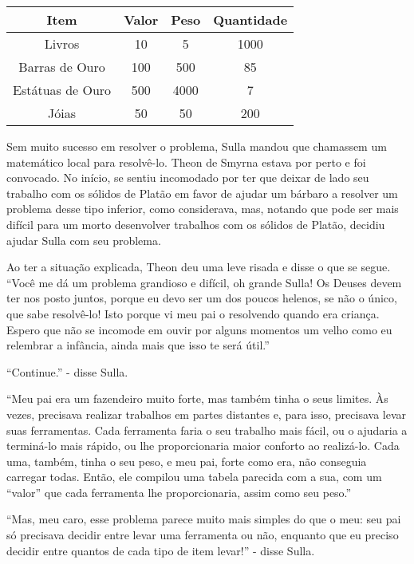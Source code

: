 \begin{center}
  \begin{tabular}{c|c|c|c}
    Item & Valor & Peso & Quantidade\\ \hline Livros & 10 & 5 & 1000
    \\ Barras de Ouro & 100 & 500 & 85 \\ Estátuas de Ouro & 500 &
    4000 & 7 \\ Jóias & 50 & 50 & 200 \\
  \end{tabular}
\end{center}

Sem muito sucesso em resolver o problema, Sulla mandou que chamassem
um matemático local para resolvê-lo. Theon de Smyrna estava por perto
e foi convocado. No início, se sentiu incomodado por ter que deixar de
lado seu trabalho com os sólidos de Platão em favor de ajudar um
bárbaro a resolver um problema desse tipo inferior, como considerava,
mas, notando que pode ser mais difícil para um morto desenvolver
trabalhos com os sólidos de Platão, decidiu ajudar Sulla com seu
problema.

Ao ter a situação explicada, Theon deu uma leve risada e disse o que
se segue. ``Você me dá um problema grandioso e difícil, oh grande
Sulla! Os Deuses devem ter nos posto juntos, porque eu devo ser um dos
poucos helenos, se não o único, que sabe resolvê-lo! Isto porque vi
meu pai o resolvendo quando era criança. Espero que não se incomode em
ouvir por alguns momentos um velho como eu relembrar a infância, ainda
mais que isso te será útil.''

``Continue.'' - disse Sulla.

``Meu pai era um fazendeiro muito forte, mas também tinha o seus
limites. Às vezes, precisava realizar trabalhos em partes distantes e,
para isso, precisava levar suas ferramentas. Cada ferramenta faria o
seu trabalho mais fácil, ou o ajudaria a terminá-lo mais rápido, ou
lhe proporcionaria maior conforto ao realizá-lo. Cada uma, também,
tinha o seu peso, e meu pai, forte como era, não conseguia carregar
todas. Então, ele compilou uma tabela parecida com a sua, com um
``valor'' que cada ferramenta lhe proporcionaria, assim como seu
peso.''

``Mas, meu caro, esse problema parece muito mais simples do que o meu:
seu pai só precisava decidir entre levar uma ferramenta ou não,
enquanto que eu preciso decidir entre quantos de cada tipo de item
levar!'' - disse Sulla.

